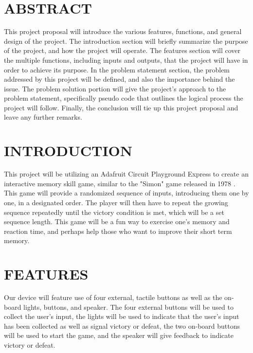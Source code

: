 \documentclass[12pt]{article}
\begin{document}
\tableofcontents
\pagebreak

\section{ABSTRACT}
This project proposal will introduce the various features, functions, and general design of the project. The introduction section will briefly summarize the purpose of the project, and how the project will operate. The features section will cover the multiple functions, including inputs and outputs, that the project will have in order to achieve its purpose.
In the problem statement section, the problem addressed by this project will be defined, and also the importance behind the issue. The problem solution portion will give the project's approach to the problem statement, specifically pseudo code that outlines the logical process the project will follow. Finally, the conclusion will tie up this project proposal and leave any further remarks.

\section{INTRODUCTION}
This project will be utilizing an Adafruit Circuit Playground Express to create an interactive memory skill game, similar to the "Simon" game released in 1978 \cite{Edwards}. This game will provide a randomized sequence of inputs, introducing them one by one, in a designated order. The player will then have to repeat the growing sequence repeatedly until the victory condition is met, which will be a set sequence length. This game will be a fun way to exercise one's memory and reaction time, and perhaps help those who want to improve their short term memory.   

\section{FEATURES}
Our device will feature use of four external, tactile buttons as well as the on-board lights, buttons, and speaker. The four external buttons will be used to collect the user's input, the lights will be used to indicate that the user's input has been collected as well as signal victory or defeat, the two on-board buttons will be used to start the game, and the speaker will give feedback to indicate victory or defeat.
\end{document}
